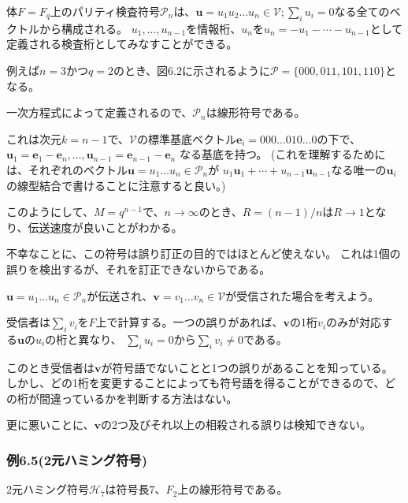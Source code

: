 \documentclass[12pt,a4paper]{article}
\begin{document}
体\(F = F_q\)上のパリティ検査符号\(\mathcal{P}_n\)は、\(\mathbf{u} = u_1 u_2 \dots u_n \in \mathcal{V} ; \sum_{i} u_i = 0\)なる全てのベクトルから構成される。
\(u_1, \dots , u_{n-1}\)を情報桁、\(u_n\)を\(u_n = - u_1 - \cdots - u_{n-1}\)として定義される検査桁としてみなすことができる。

例えば\(n=3\)かつ\(q=2\)のとき、図6.2に示されるように\(\mathcal{P} = \lbrace 000, 011, 101,110 \rbrace\)となる。

一次方程式によって定義されるので、\(\mathcal{P}_n\)は線形符号である。

これは次元\(k = n - 1\)で、\(\mathcal{V}\)の標準基底ベクトル\(\mathbf{e}_i = 000\dots 010 \dots 0\)の下で、
\(\mathbf{u}_1 = \mathbf{e}_1 - \mathbf{e}_n , \dots , \mathbf{u}_{n-1} = \mathbf{e}_{n-1} - \mathbf{e}_n\)
なる基底を持つ。
(これを理解するためには、それぞれのベクトル\(\mathbf{u} = u_1 \dots u_n \in \mathcal{P}_n\)が
\(u_1 \mathbf{u}_1 + \cdots + u_{n-1} \mathbf{u}_{n-1}\)なる唯一の\(\mathbf{u}_i\)の線型結合で書けることに注意すると良い。)

このようにして、\(M = q^{n-1}\)で、\(n \rightarrow \infty\)のとき、\(R = (n-1)/n\)は\(R \rightarrow 1\)となり、伝送速度が良いことがわかる。

不幸なことに、この符号は誤り訂正の目的ではほとんど使えない。
これは1個の誤りを検出するが、それを訂正できないからである。

\(\mathbf{u} = u_1 \dots u_n \in \mathcal{P}_n\)が伝送され、\(\mathbf{v} = v_1 \dots v_n \in \mathcal{V}\)が受信された場合を考えよう。

受信者は\(\sum_i v_i\)を\(F\)上で計算する。一つの誤りがあれば、\(\mathbf{v}\)の1桁\(v_i\)のみが対応する\(\mathbf{u}\)の\(u_i\)の桁と異なり、
\(\sum_i u_i = 0\)から\(\sum_i v_i \neq 0\)である。

このとき受信者は\(\mathbf{v}\)が符号語でないことと1つの誤りがあることを知っている。
しかし、どの1桁を変更することによっても符号語を得ることができるので、どの桁が間違っているかを判断する方法はない。

更に悪いことに、\(\mathbf{v}\)の2つ及びそれ以上の相殺される誤りは検知できない。

\subsubsection*{例6.5(2元ハミング符号)}\label{ux4f8b6.52ux5143ux30cfux30dfux30f3ux30b0ux7b26ux53f7}

2元ハミング符号\(\mathcal{H}_7\)は符号長\(7\)、\(F_2\)上の線形符号である。
\end{document}
